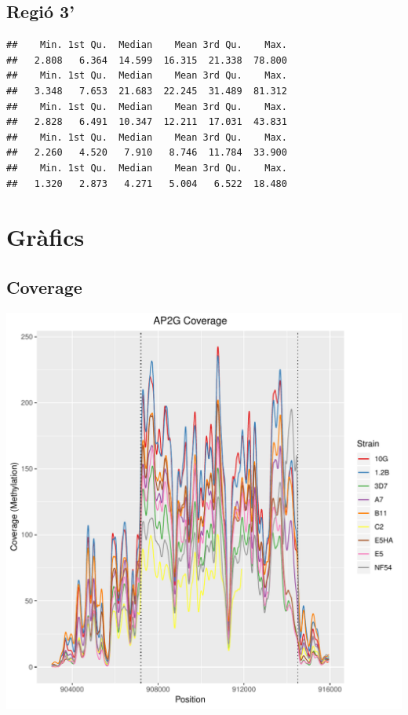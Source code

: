 \documentclass{article}\usepackage[]{graphicx}\usepackage[]{color}
\makeatletter
\newenvironment{kframe}{%
 \def\at@end@of@kframe{}%
 \ifinner\ifhmode%
  \def\at@end@of@kframe{\end{minipage}}%
  \begin{minipage}{\columnwidth}%
 \fi\fi%
 \def\FrameCommand##1{\hskip\@totalleftmargin \hskip-\fboxsep
 \colorbox{shadecolor}{##1}\hskip-\fboxsep
     \hskip-\linewidth \hskip-\@totalleftmargin \hskip\columnwidth}%
 \MakeFramed {\advance\hsize-\width
   \@totalleftmargin\z@ \linewidth\hsize
   \@setminipage}}%
 {\par\unskip\endMakeFramed%
 \at@end@of@kframe}
\newenvironment{knitrout}{}{} %
\makeatother
\begin{document}
\subsection{Regió 3'}
\begin{knitrout}
\color{fgcolor}\begin{kframe}
\begin{verbatim}
##    Min. 1st Qu.  Median    Mean 3rd Qu.    Max. 
##   2.808   6.364  14.599  16.315  21.338  78.800 
##    Min. 1st Qu.  Median    Mean 3rd Qu.    Max. 
##   3.348   7.653  21.683  22.245  31.489  81.312 
##    Min. 1st Qu.  Median    Mean 3rd Qu.    Max. 
##   2.828   6.491  10.347  12.211  17.031  43.831 
##    Min. 1st Qu.  Median    Mean 3rd Qu.    Max. 
##   2.260   4.520   7.910   8.746  11.784  33.900 
##    Min. 1st Qu.  Median    Mean 3rd Qu.    Max. 
##   1.320   2.873   4.271   5.004   6.522  18.480
\end{verbatim}
\end{kframe}
\end{knitrout}
\clearpage



\section{Gràfics}
\subsection{Coverage}
\begin{knitrout}
\color{fgcolor}
\includegraphics[width=1\linewidth]{figure/plot_coverage-1} 

\end{knitrout}
\clearpage
\end{document}
